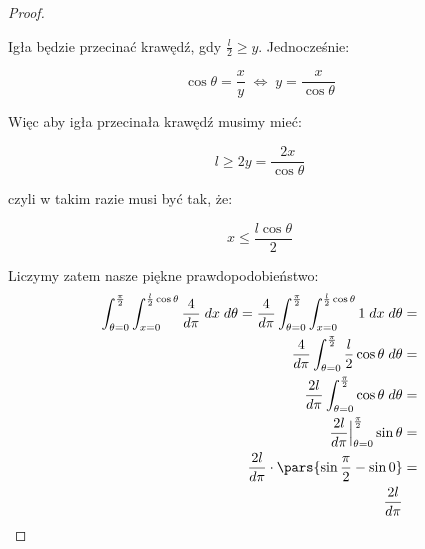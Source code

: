 \begin{proof}
\begin{center}
    \end{center}
    
    Igła będzie przecinać krawędź, gdy \( \frac{l}{2} \geq y\). Jednocześnie:
    
    \[
        \cos{\theta} = \frac{x}{y} \; \iff \; y = \frac{x}{\cos{\theta}} 
    \]
    
    Więc aby igła przecinała krawędź musimy mieć: 
    
    \[ 
        l \geq 2y = \frac{2x}{\cos{\theta}}
    \]
    
    czyli w takim razie musi być tak, że: 
    
    \[ 
        x \leq \frac{l \cos{\theta}}{2}
    \]
    
    Liczymy zatem nasze piękne prawdopodobieństwo:
    \begin{align*}
        \int_{\theta=0}^{\frac{\pi}{2}} \int_{x=0}^{\frac{l}{2}\cos{\theta}} \frac{4}{d\pi} \; dx\; d\theta = \frac{4}{d\pi}  \int_{\theta=0}^{\frac{\pi}{2}} \int_{x=0}^{\frac{l}{2}\cos{\theta}} 1 \; dx \; d\theta &= \\
        \frac{4}{d\pi}  \int_{\theta=0}^{\frac{\pi}{2}} \frac{l}{2} \cos{\theta} \; d\theta &= \\ 
        \frac{2l}{d\pi}  \int_{\theta=0}^{\frac{\pi}{2}} \cos{\theta} \; d\theta &= \\ 
         \frac{2l}{d\pi} \Big\rvert_{\theta=0}^{\frac{\pi}{2}} \sin{\theta} &= \\
         \frac{2l}{d\pi} \cdot \pars{\sin{\frac{\pi}{2}} - \sin{0}} &= \\ 
         \frac{2l}{d\pi}
    \end{align*}
\end{proof}